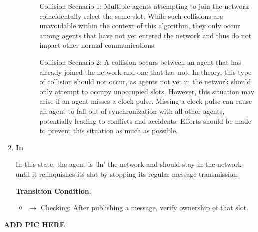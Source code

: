 \begin{enumerate}
\begin{itemize}
\begin{itemize}
            Collision Scenario 1: Multiple agents attempting to join the network coincidentally select the same slot. While such collisions are unavoidable within the context of this algorithm, they only occur among agents that have not yet entered the network and thus do not impact other normal communications.
            
            Collision Scenario 2: A collision occurs between an agent that has already joined the network and one that has not. In theory, this type of collision should not occur, as agents not yet in the network should only attempt to occupy unoccupied slots. However, this situation may arise if an agent misses a clock pulse. Missing a clock pulse can cause an agent to fall out of synchronization with all other agents, potentially leading to conflicts and accidents. Efforts should be made to prevent this situation as much as possible.
        \end{itemize}

    \end{itemize}    


    \item \textbf{In}
    
    In this state, the agent is 'In' the network and should stay in the network until it relinquishes its slot by stopping its regular message transmission.
    
    \textbf{Transition Condition}:
    \begin{itemize}
        \item $\rightarrow$ Checking: After publishing a message, verify ownership of that slot.
    \end{itemize}

\end{enumerate}

\textbf{ADD PIC HERE} %

